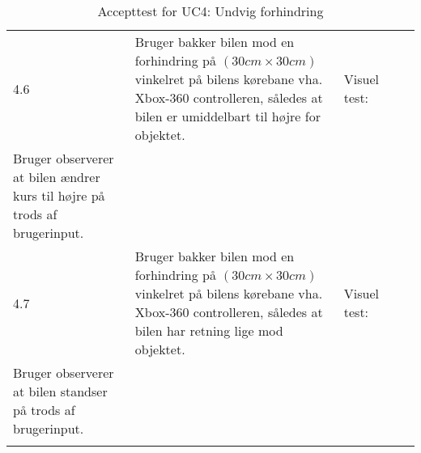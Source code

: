 \begin{longtable}{| l | >{\raggedright}X | >{\raggedright}X | >{\raggedright}X | >{\raggedright\arraybackslash}p{2.3cm} |}
	4.6 & Bruger bakker bilen mod en forhindring på $(30cm \times 30cm)$ vinkelret på bilens kørebane vha. Xbox-360 controlleren, således at bilen er umiddelbart til højre for objektet. & Visuel test: \\ Bruger observerer at bilen ændrer kurs til højre på trods af brugerinput. & ~ & ~\\ \hline
	
	4.7 & Bruger bakker bilen mod en forhindring på $(30cm \times 30cm)$ vinkelret på bilens kørebane vha. Xbox-360 controlleren, således at bilen har retning lige mod objektet. & Visuel test: \\ Bruger observerer at bilen standser på trods af brugerinput. & ~ & ~\\\hline

\caption{Accepttest for UC4: Undvig forhindring}\label{tbl:acceptuc4}
\end{longtable}